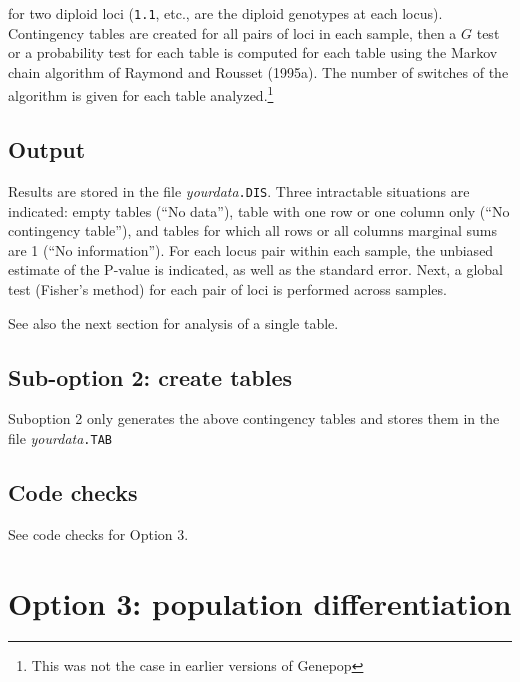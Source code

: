 \documentclass[
  12pt,
]{book}
\begin{document}
for two diploid loci (\texttt{1.1}, etc., are the diploid genotypes at each locus). Contingency tables are created for all pairs of loci in each sample, then a \(G\) test or a probability test for each table is computed for each table using the Markov chain algorithm of Raymond and Rousset (1995a). The number of switches of the algorithm is given for each table analyzed.\footnote{This was not the case in earlier versions of Genepop}

\hypertarget{output-1}{%
\subsection{Output}\label{output-1}}

Results are stored in the file \emph{yourdata}\texttt{.DIS}. Three intractable situations are indicated: empty tables (``No data''), table with one row or one column only (``No contingency table''), and tables for which all rows or all columns marginal sums are 1 (``No information''). For each locus pair within each sample, the unbiased estimate of the P-value is indicated, as well as the standard error. Next, a global test (Fisher's method) for each pair of loci is performed across samples.

See also the next section for analysis of a single table.

\hypertarget{sub-option-2-create-tables}{%
\subsection{Sub-option 2: create tables}\label{sub-option-2-create-tables}}

Suboption 2 only generates the above contingency tables and stores them in the file \emph{yourdata}\texttt{.TAB}

\hypertarget{code-checks-1}{%
\subsection{Code checks}\label{code-checks-1}}

See code checks for Option 3.

\hypertarget{option-3-population-differentiation}{%
\section{Option 3: population differentiation}\label{option-3-population-differentiation}}
\end{document}
